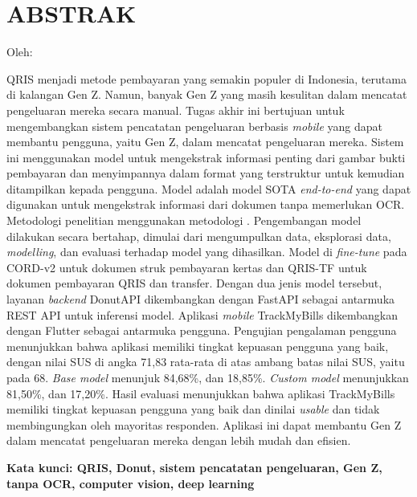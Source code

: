 \clearpage
\chapter*{ABSTRAK}
\begin{center}
	\center
	\begin{singlespace}
		\large\bfseries{\thetitle}

		\normalfont\normalsize
		Oleh:

		\bfseries \theauthor
	\end{singlespace}
\end{center}

\begin{singlespace}
	QRIS menjadi metode pembayaran yang semakin populer di Indonesia, terutama di kalangan Gen Z. Namun, banyak Gen Z yang masih kesulitan dalam mencatat pengeluaran mereka secara manual. Tugas akhir ini bertujuan untuk mengembangkan sistem pencatatan pengeluaran berbasis \emph{mobile} yang dapat membantu pengguna, yaitu Gen Z, dalam mencatat pengeluaran mereka. Sistem ini menggunakan model \donut{} untuk mengekstrak informasi penting dari gambar bukti pembayaran dan menyimpannya dalam format yang terstruktur untuk kemudian ditampilkan kepada pengguna. Model \donut{} adalah model SOTA \emph{end-to-end} yang dapat digunakan untuk mengekstrak informasi dari dokumen tanpa memerlukan OCR. Metodologi penelitian menggunakan metodologi \dsrm. Pengembangan model dilakukan secara bertahap, dimulai dari mengumpulkan data, eksplorasi data, \emph{modelling}, dan evaluasi terhadap model yang dihasilkan. Model \donut{} di \emph{fine-tune} pada \dataset{} CORD-v2 untuk dokumen struk pembayaran kertas dan \dataset{} QRIS-TF untuk dokumen pembayaran QRIS dan transfer. Dengan dua jenis model tersebut, layanan \emph{backend} DonutAPI dikembangkan dengan FastAPI sebagai antarmuka REST API untuk inferensi model. Aplikasi \emph{mobile} TrackMyBills dikembangkan dengan Flutter sebagai antarmuka pengguna. Pengujian pengalaman pengguna menunjukkan bahwa aplikasi memiliki tingkat kepuasan pengguna yang baik, dengan nilai SUS di angka 71,83 rata-rata di atas ambang batas nilai SUS, yaitu pada 68.  \emph{Base model} menunjuk \fscore{} 84,68\%, dan \mcer{} 18,85\%. \emph{Custom model} menunjukkan  \fscore{} 81,50\%, dan \mcer{} 17,20\%. Hasil evaluasi menunjukkan bahwa aplikasi TrackMyBills memiliki tingkat kepuasan pengguna yang baik dan dinilai \emph{usable} dan tidak membingungkan oleh mayoritas responden. Aplikasi ini dapat membantu Gen Z dalam mencatat pengeluaran mereka dengan lebih mudah dan efisien.

	\textbf{Kata kunci: QRIS, Donut, sistem pencatatan pengeluaran, Gen Z, tanpa OCR, computer vision, deep learning}

\end{singlespace}
\clearpage